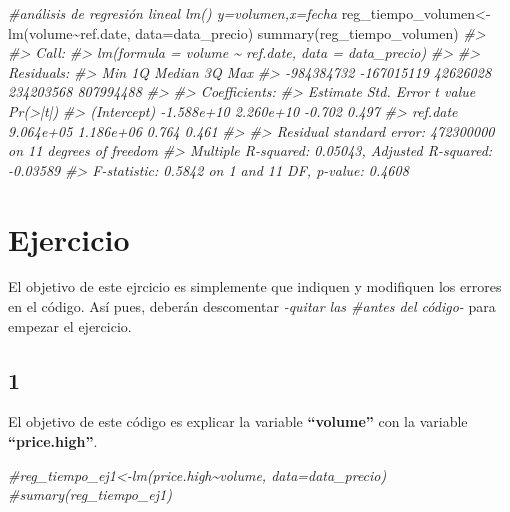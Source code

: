 \documentclass[
]{book}
\newenvironment{Shaded}{\begin{snugshade}}{\end{snugshade}}
\newcommand{\AttributeTok}[1]{\textcolor[rgb]{0.77,0.63,0.00}{#1}}
\newcommand{\CommentTok}[1]{\textcolor[rgb]{0.56,0.35,0.01}{\textit{#1}}}
\newcommand{\FunctionTok}[1]{\textcolor[rgb]{0.00,0.00,0.00}{#1}}
\newcommand{\NormalTok}[1]{#1}
\newcommand{\OtherTok}[1]{\textcolor[rgb]{0.56,0.35,0.01}{#1}}
\newcommand{\SpecialCharTok}[1]{\textcolor[rgb]{0.00,0.00,0.00}{#1}}
\begin{document}
\begin{Shaded}
\begin{Highlighting}[]
\CommentTok{\#análisis de regresión lineal lm() y=volumen,x=fecha}
\NormalTok{reg\_tiempo\_volumen}\OtherTok{\textless{}{-}}\FunctionTok{lm}\NormalTok{(volume}\SpecialCharTok{\textasciitilde{}}\NormalTok{ref.date, }\AttributeTok{data=}\NormalTok{data\_precio)}
\FunctionTok{summary}\NormalTok{(reg\_tiempo\_volumen)}
\CommentTok{\#\textgreater{} }
\CommentTok{\#\textgreater{} Call:}
\CommentTok{\#\textgreater{} lm(formula = volume \textasciitilde{} ref.date, data = data\_precio)}
\CommentTok{\#\textgreater{} }
\CommentTok{\#\textgreater{} Residuals:}
\CommentTok{\#\textgreater{}        Min         1Q     Median         3Q        Max }
\CommentTok{\#\textgreater{} {-}984384732 {-}167015119   42626028  234203568  807994488 }
\CommentTok{\#\textgreater{} }
\CommentTok{\#\textgreater{} Coefficients:}
\CommentTok{\#\textgreater{}               Estimate Std. Error t value Pr(\textgreater{}|t|)}
\CommentTok{\#\textgreater{} (Intercept) {-}1.588e+10  2.260e+10  {-}0.702    0.497}
\CommentTok{\#\textgreater{} ref.date     9.064e+05  1.186e+06   0.764    0.461}
\CommentTok{\#\textgreater{} }
\CommentTok{\#\textgreater{} Residual standard error: 472300000 on 11 degrees of freedom}
\CommentTok{\#\textgreater{} Multiple R{-}squared:  0.05043,    Adjusted R{-}squared:  {-}0.03589 }
\CommentTok{\#\textgreater{} F{-}statistic: 0.5842 on 1 and 11 DF,  p{-}value: 0.4608}
\end{Highlighting}
\end{Shaded}

\hypertarget{ejercicio}{%
\section{Ejercicio}\label{ejercicio}}

El objetivo de este ejrcicio es simplemente que indiquen y modifiquen los errores en el código. Así pues, deberán descomentar \emph{-quitar las \#antes del código-} para empezar el ejercicio.

\hypertarget{section}{%
\subsection{1}\label{section}}

El objetivo de este código es explicar la variable \textbf{``volume''} con la variable \textbf{``price.high''}.

\begin{Shaded}
\begin{Highlighting}[]
\CommentTok{\#reg\_tiempo\_ej1\textless{}{-}lm(price.high\textasciitilde{}volume, data=data\_precio)}
\CommentTok{\#sumary(reg\_tiempo\_ej1)}
\end{Highlighting}
\end{Shaded}
\end{document}
